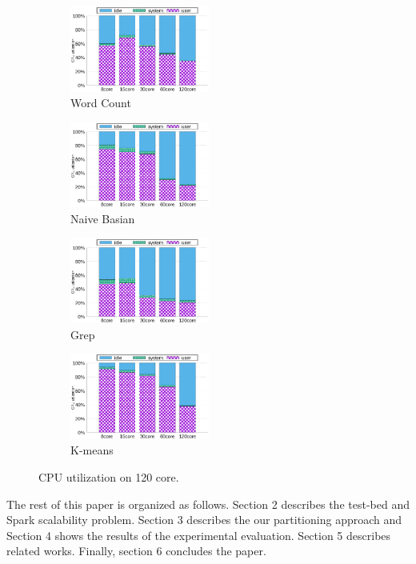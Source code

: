 \begin{figure}[tb]
    \centering
    \begin{subfigure}[b]{0.25\textwidth}
        \includegraphics[width=1.8in]{graph/wc_cpuutils.eps}
        \caption{Word Count}
    \end{subfigure}%
    \begin{subfigure}[b]{0.25\textwidth}
        \includegraphics[width=1.8in]{graph/nb_cpuutils.eps}
        \caption{Naive Basian}
    \end{subfigure}%
    \begin{subfigure}[b]{0.25\textwidth}
        \includegraphics[width=1.8in]{graph/grep_cpuutils.eps}
        \caption{Grep}
    \end{subfigure}%
    \begin{subfigure}[b]{0.25\textwidth}
        \includegraphics[width=1.8in]{graph/kmeans_cpuutils.eps}
        \caption{K-means}
    \end{subfigure}%
        \centering
    \caption{CPU utilization on 120 core.}
    \label{fig:cpuutilization}
\end{figure}

The rest of this paper is organized as follows.
Section 2 describes the test-bed and Spark scalability problem.
Section 3 describes the our partitioning approach and 
Section 4 shows the results of the experimental evaluation. 
Section 5 describes related works. 
Finally, section 6 concludes the paper.

